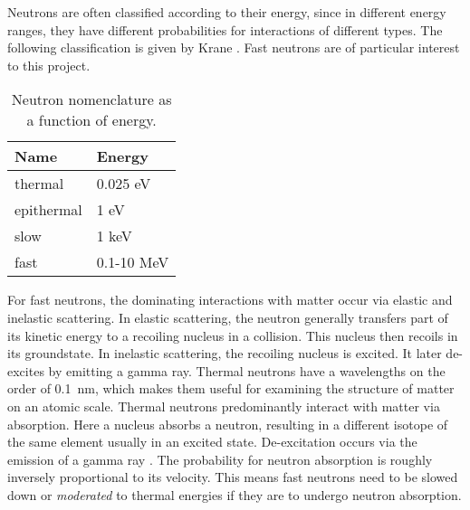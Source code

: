 \documentclass[main.tex]{subfiles}
\begin{document}
Neutrons are often classified according to their energy, since in different energy ranges, they have different probabilities for interactions of different types. The following classification is given by Krane \cite{Krane}. Fast neutrons are of particular interest to this project.

\begin{table}[h]
\center
\begin{tabular}{|l|l|}
\hline
\textbf{Name} & \textbf{Energy} \\ \hline
thermal       & 0.025 eV        \\ \hline
epithermal    & 1 eV            \\ \hline
slow          & 1 keV           \\ \hline
fast          & 0.1-10 MeV      \\ \hline
\end{tabular}
\caption[Neutron nomenclature as a function of energy.]{Neutron nomenclature as a function of energy.}
\label{tab:neutron}
\end{table}

For fast neutrons, the dominating interactions with matter occur via elastic and inelastic scattering. In elastic scattering, the neutron generally transfers part of its kinetic energy to a recoiling nucleus in a collision. This nucleus then recoils in its groundstate. In inelastic scattering, the recoiling nucleus is excited. It later de-excites by emitting a gamma ray. Thermal neutrons have a wavelengths on the order of \SI{0.1}{nm}, which makes them useful for examining the structure of matter on an atomic scale. 
Thermal neutrons predominantly interact with matter via absorption. Here a nucleus absorbs a neutron, resulting in a different isotope of the same element usually in an excited state. De-excitation occurs via the emission of a gamma ray \cite{Leo}. The probability for neutron absorption is roughly inversely proportional to its velocity. This means fast neutrons need to be slowed down or \textit{moderated} to thermal energies if they are to undergo neutron absorption. 
\end{document}
